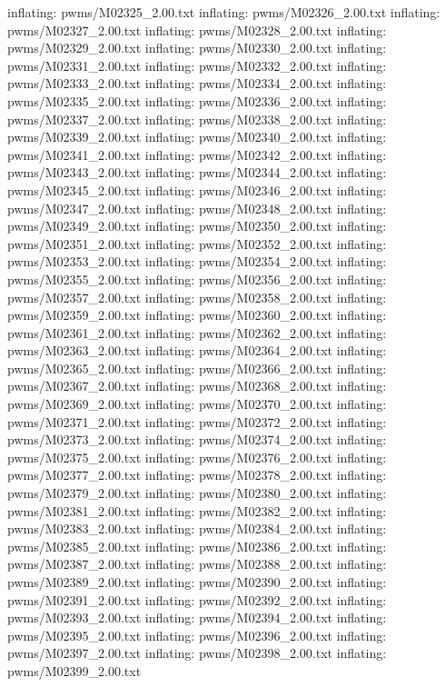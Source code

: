 \documentclass[letterpaper,10pt,english]{sphinxmanual}
\begin{document}
{\begin{sphinxVerbatim}[commandchars=\\\{\}]
  inflating: pwms/M02325\_2.00.txt
  inflating: pwms/M02326\_2.00.txt
  inflating: pwms/M02327\_2.00.txt
  inflating: pwms/M02328\_2.00.txt
  inflating: pwms/M02329\_2.00.txt
  inflating: pwms/M02330\_2.00.txt
  inflating: pwms/M02331\_2.00.txt
  inflating: pwms/M02332\_2.00.txt
  inflating: pwms/M02333\_2.00.txt
  inflating: pwms/M02334\_2.00.txt
  inflating: pwms/M02335\_2.00.txt
  inflating: pwms/M02336\_2.00.txt
  inflating: pwms/M02337\_2.00.txt
  inflating: pwms/M02338\_2.00.txt
  inflating: pwms/M02339\_2.00.txt
  inflating: pwms/M02340\_2.00.txt
  inflating: pwms/M02341\_2.00.txt
  inflating: pwms/M02342\_2.00.txt
  inflating: pwms/M02343\_2.00.txt
  inflating: pwms/M02344\_2.00.txt
  inflating: pwms/M02345\_2.00.txt
  inflating: pwms/M02346\_2.00.txt
  inflating: pwms/M02347\_2.00.txt
  inflating: pwms/M02348\_2.00.txt
  inflating: pwms/M02349\_2.00.txt
  inflating: pwms/M02350\_2.00.txt
  inflating: pwms/M02351\_2.00.txt
  inflating: pwms/M02352\_2.00.txt
  inflating: pwms/M02353\_2.00.txt
  inflating: pwms/M02354\_2.00.txt
  inflating: pwms/M02355\_2.00.txt
  inflating: pwms/M02356\_2.00.txt
  inflating: pwms/M02357\_2.00.txt
  inflating: pwms/M02358\_2.00.txt
  inflating: pwms/M02359\_2.00.txt
  inflating: pwms/M02360\_2.00.txt
  inflating: pwms/M02361\_2.00.txt
  inflating: pwms/M02362\_2.00.txt
  inflating: pwms/M02363\_2.00.txt
  inflating: pwms/M02364\_2.00.txt
  inflating: pwms/M02365\_2.00.txt
  inflating: pwms/M02366\_2.00.txt
  inflating: pwms/M02367\_2.00.txt
  inflating: pwms/M02368\_2.00.txt
  inflating: pwms/M02369\_2.00.txt
  inflating: pwms/M02370\_2.00.txt
  inflating: pwms/M02371\_2.00.txt
  inflating: pwms/M02372\_2.00.txt
  inflating: pwms/M02373\_2.00.txt
  inflating: pwms/M02374\_2.00.txt
  inflating: pwms/M02375\_2.00.txt
  inflating: pwms/M02376\_2.00.txt
  inflating: pwms/M02377\_2.00.txt
  inflating: pwms/M02378\_2.00.txt
  inflating: pwms/M02379\_2.00.txt
  inflating: pwms/M02380\_2.00.txt
  inflating: pwms/M02381\_2.00.txt
  inflating: pwms/M02382\_2.00.txt
  inflating: pwms/M02383\_2.00.txt
  inflating: pwms/M02384\_2.00.txt
  inflating: pwms/M02385\_2.00.txt
  inflating: pwms/M02386\_2.00.txt
  inflating: pwms/M02387\_2.00.txt
  inflating: pwms/M02388\_2.00.txt
  inflating: pwms/M02389\_2.00.txt
  inflating: pwms/M02390\_2.00.txt
  inflating: pwms/M02391\_2.00.txt
  inflating: pwms/M02392\_2.00.txt
  inflating: pwms/M02393\_2.00.txt
  inflating: pwms/M02394\_2.00.txt
  inflating: pwms/M02395\_2.00.txt
  inflating: pwms/M02396\_2.00.txt
  inflating: pwms/M02397\_2.00.txt
  inflating: pwms/M02398\_2.00.txt
  inflating: pwms/M02399\_2.00.txt

\end{sphinxVerbatim}}
\end{document}
